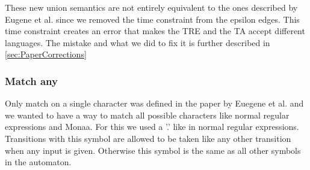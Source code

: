 

These new union semantics are not entirely equivalent to the ones described by Eugene et al. since we removed the time constraint from the epsilon edges.
This time constraint creates an error that makes the TRE and the TA accept different languages.
The mistake and what we did to fix it is further described in \cref{sec:PaperCorrections}

\subsubsection{Match any}
Only match on a single character was defined in the paper by Euegene et al. and we wanted to have a way to match all possible characters like normal regular expressions and Monaa. For this we used a '.' like in normal regular expressions. Transitions with this symbol are allowed to be taken like any other transition when any input is given. Otherwise this symbol is the same as all other symbols in the automaton.


